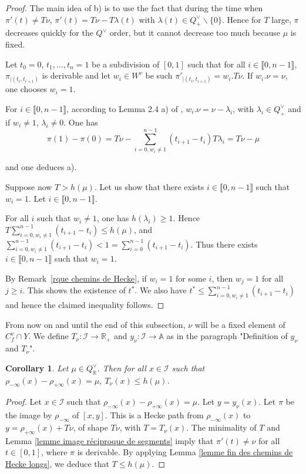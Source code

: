 \documentclass[12pt]{article}
\theoremstyle{plain}
\newtheorem{corollary}[theorem]{Corollary}
\theoremstyle{definition}
\newcommand{\R}{\mathbb{R}}
\newcommand{\A}{\mathbb{A}}
\newcommand{\I}{\mathcal{I}}
\begin{document}
\begin{proof} The main idea of b) is to use the fact that during the time when $\pi'(t)\neq T\nu$, $\pi'(t)=T\nu-T\lambda(t)$ with $\lambda(t)\in Q^\vee_+\backslash \{0\}$. Hence for $T$ large, $\pi$ decreases quickly for the $Q^\vee$ order, but it cannot decrease too much because $\mu$ is fixed.

Let $t_0=0$, $t_1, \ldots,t_n=1$ be a subdivision of $[0,1]$ such that for all $i\in \llbracket 0,n-1\rrbracket $, $\pi_{|(t_i,t_{i+1})}$ is derivable and let $w_i\in W^v$ be such $\pi'_{|(t_i,t_{i+1})}=w_i.T\nu$. If $w_i.\nu=\nu$, one chooses $w_i=1$.

For $i\in \llbracket 0,n-1\rrbracket$, according to Lemma 2.4 a) of \cite{gaussent2008kac}, $w_i.\nu =\nu -\lambda_i$, with $\lambda_i \in Q^\vee_+$ and if $w_i\neq 1$, $\lambda_i\neq 0$. One has \[\pi(1)-\pi(0)=T\nu-\sum_{i=0, w_i\neq 1}^{n-1}(t_{i+1}-t_i)T\lambda_i=T\nu -\mu\]

and one deduces a).


Suppose now $T>h(\mu)$. Let us show that there exists $i\in \llbracket 0,n-1\rrbracket$ such that $w_i=1$. Let $i\in \llbracket 0,n-1\rrbracket$. 

For all $i$ such that $w_i\neq 1$, one has $h(\lambda_i)\geq 1$. Hence $T\sum_{i=0, w_i\neq 1}^{n-1}(t_{i+1}-t_i)\leq h(\mu)$, and $\sum_{i=0, w_i\neq 1}^{n-1}(t_{i+1}-t_i)<1=\sum_{i=0}^{n-1}(t_{i+1}-t_i)$. Thus there exists $i\in \llbracket 0,n-1\rrbracket$ such that $w_i=1$.

By Remark~\ref{rque chemins de Hecke}, if $w_i=1$ for some $i$, then $w_j=1$ for all $j\geq i$. This shows the existence of $t^*$. We also have $t^*\leq \sum_{i=0, w_i\neq 1}^{n-1}(t_{i+1}-t_i)$ and hence the claimed inequality follows.  
\end{proof}



\medskip

From now on and until the end of this subsection, $\nu$ will be a fixed element of $C_f^v\cap Y$. We define $T_\nu:\I\rightarrow \R_+$ and $y_\nu:\I\rightarrow \A$ as in the paragraph "Definition of $y_\nu$ and $T_\nu$".

\begin{corollary}\label{corollaire majoration de T}
Let $\mu\in Q^\vee_\R$. Then for all $x\in \I$ such that $\rho_{-\infty}(x)-\rho_{+\infty}(x)=\mu$, $T_\nu(x)\leq h(\mu)$.
\end{corollary}

\begin{proof} Let $x\in \I$ such that $\rho_{-\infty}(x)-\rho_{+\infty}(x)=\mu$. Let $y=y_\nu(x)$. Let $\pi$ be the image by $\rho_{-\infty}$ of $[x,y]$. This is a Hecke path from $\rho_{-\infty}(x)$ to $y=\rho_{+\infty}(x)+T\nu$, of shape $T\nu$, with $T=T_\nu(x)$. The minimality of $T$ and Lemma \ref{lemme image réciproque de segments} imply that $\pi'(t)\neq \nu$ for all $t\in [0,1]$, where $\pi$ is derivable. By applying Lemma \ref{lemme fin des chemins de Hecke longs}, we deduce that $T\leq h(\mu)$.  
\end{proof}
\end{document}
